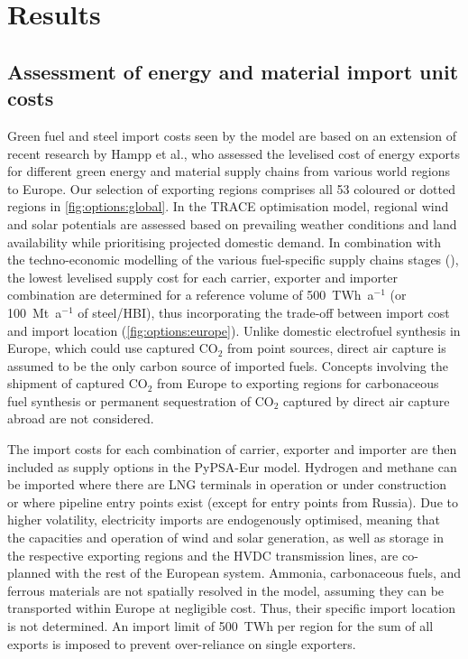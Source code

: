 
\section*{Results}

\subsection*{Assessment of energy and material import unit costs}
\label{sec:results-1}



Green fuel and steel import costs seen by the model are based on an extension of
recent research by Hampp et al.,\cite{hamppImportOptions2023} who assessed the
levelised cost of energy exports for different green energy and material supply
chains from various world regions to Europe. Our selection of exporting regions
comprises all 53 coloured or dotted regions in \cref{fig:options:global}. In the
TRACE optimisation model,\cite{hamppImportOptions2023} regional wind and solar
potentials are assessed based on prevailing weather conditions and land
availability while prioritising projected domestic demand. In combination with
the techno-economic modelling of the various fuel-specific supply chains stages
(), the lowest levelised supply cost for each
carrier, exporter and importer combination are determined for a reference volume
of 500~TWh~a$^{-1}$ (or 100~Mt~a$^{-1}$ of steel/HBI), thus incorporating the
trade-off between import cost and import location (\cref{fig:options:europe}).
Unlike domestic electrofuel synthesis in Europe, which could use captured CO$_2$
from point sources, direct air capture is assumed to be the only carbon source
of imported fuels. Concepts involving the shipment of captured CO$_2$ from
Europe to exporting regions for carbonaceous fuel synthesis or permanent
sequestration of CO$_2$ captured by direct air capture abroad are not
considered.\cite{treeenergysolutionsGreenCycle2024,fonderSyntheticMethaneClosing2024}


The import costs for each combination of carrier, exporter and importer are then
included as supply options in the PyPSA-Eur model. Hydrogen and methane can be
imported where there are LNG terminals in operation or under construction or
where pipeline entry points exist (except for entry points from Russia). Due to
higher volatility, electricity imports are endogenously optimised, meaning that
the capacities and operation of wind and solar generation, as well as storage in
the respective exporting regions and the HVDC transmission lines, are co-planned
with the rest of the European system. Ammonia, carbonaceous fuels, and ferrous
materials are not spatially resolved in the model, assuming they can be
transported within Europe at negligible cost. Thus, their specific import
location is not determined. An import limit of 500~TWh per region for the sum of
all exports is imposed to prevent over-reliance on single exporters.

